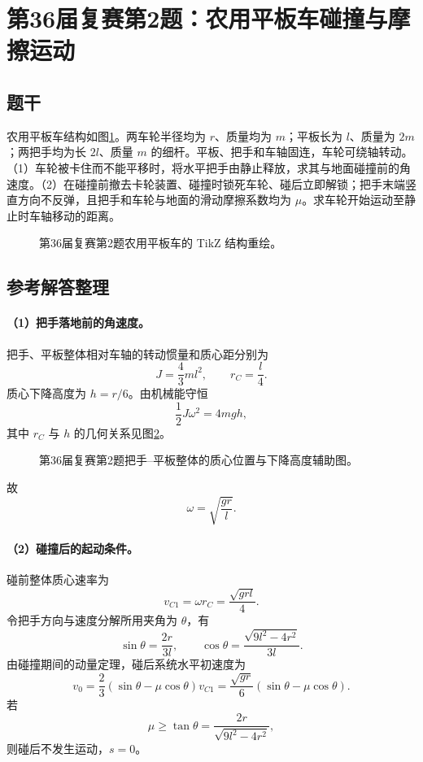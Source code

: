 \section{第36届复赛第2题：农用平板车碰撞与摩擦运动}
\subsection{题干}
农用平板车结构如图\ref{fig:cpho36q02}。两车轮半径均为 $r$、质量均为 $m$；平板长为 $l$、质量为 $2m$；两把手均为长 $2l$、质量 $m$ 的细杆。平板、把手和车轴固连，车轮可绕轴转动。（1）车轮被卡住而不能平移时，将水平把手由静止释放，求其与地面碰撞前的角速度。（2）在碰撞前撤去卡轮装置、碰撞时锁死车轮、碰后立即解锁；把手末端竖直方向不反弹，且把手和车轮与地面的滑动摩擦系数均为 $\mu$。求车轮开始运动至静止时车轴移动的距离。
\begin{figure}[htbp]\centering

\caption{第36届复赛第2题农用平板车的 TikZ 结构重绘。}\label{fig:cpho36q02}
\end{figure}

\subsection{参考解答整理}
\paragraph{（1）把手落地前的角速度。} 把手、平板整体相对车轴的转动惯量和质心距分别为
\[
J=\frac43ml^2,\qquad r_C=\frac l4.
\]
质心下降高度为 $h=r/6$。由机械能守恒
\[
\frac12J\omega^2=4mgh,
\]
其中 $r_C$ 与 $h$ 的几何关系见图\ref{fig:cpho36q02geometry}。
\begin{figure}[htbp]\centering

\caption{第36届复赛第2题把手--平板整体的质心位置与下降高度辅助图。}\label{fig:cpho36q02geometry}
\end{figure}
故
\[
\boxed{\omega=\sqrt{\frac{gr}{l}}.}
\]

\paragraph{（2）碰撞后的起动条件。} 碰前整体质心速率为
\[
v_{C1}=\omega r_C=\frac{\sqrt{grl}}4.
\]
令把手方向与速度分解所用夹角为 $\theta$，有
\[
\sin\theta=\frac{2r}{3l},\qquad
\cos\theta=\frac{\sqrt{9l^2-4r^2}}{3l}.
\]
由碰撞期间的动量定理，碰后系统水平初速度为
\[
v_0=\frac23(\sin\theta-\mu\cos\theta)v_{C1}
=\frac{\sqrt{gr}}6(\sin\theta-\mu\cos\theta).
\]
若
\[
\boxed{\mu\ge\tan\theta=\frac{2r}{\sqrt{9l^2-4r^2}},}
\]
则碰后不发生运动，$s=0$。

